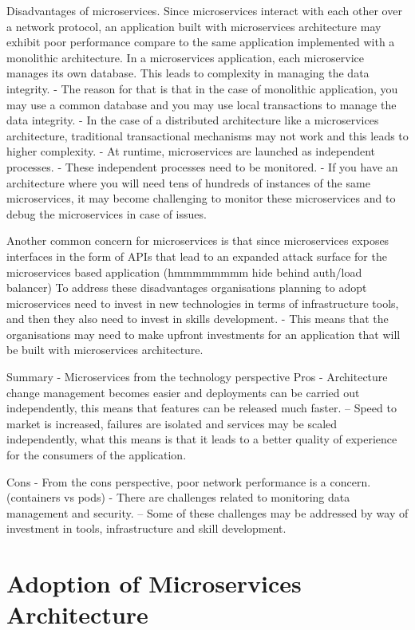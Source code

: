 \documentclass[a4paper, 11pt]{book}
\begin{document}
    Disadvantages of microservices.
    Since microservices interact with each other over a network protocol, an application built with microservices architecture may exhibit poor performance compare to the same application implemented with a monolithic architecture.
    In a microservices application, each microservice manages its own database.
    This leads to complexity in managing the data integrity.
    - The reason for that is that in the case of monolithic application, you may use a common database and you may use local transactions to manage the data integrity.
    - In the case of a distributed architecture like a microservices architecture, traditional transactional mechanisms may not work and this leads to higher complexity.
    - At runtime, microservices are launched as independent processes.
    - These independent processes need to be monitored.
    - If you have an architecture where you will need tens of hundreds of instances of the same microservices, it may become challenging to monitor these microservices and to debug the microservices in case of issues.

    Another common concern for microservices is that since microservices exposes interfaces in the form of APIs that lead to an expanded attack surface for the microservices based application (hmmmmmmmm hide behind auth/load balancer)
    To address these disadvantages organisations planning to adopt microservices need to invest in new technologies in terms of infrastructure tools, and then they also need to invest in skills development.
    - This means that the organisations may need to make upfront investments for an application that will be built with microservices architecture.


    Summary - Microservices from the technology perspective
    Pros
    - Architecture change management becomes easier and deployments can be carried out independently, this means that features can be released much faster.
    -- Speed to market is increased, failures are isolated and services may be scaled independently, what this means is that it leads to a better quality of experience for the consumers of the application.

    Cons
    - From the cons perspective, poor network performance is a concern. (containers vs pods)
    - There are challenges related to monitoring data management and security.
    -- Some of these challenges may be addressed by way of investment in tools, infrastructure and skill development.


    \section{Adoption of Microservices Architecture}
\end{document}
